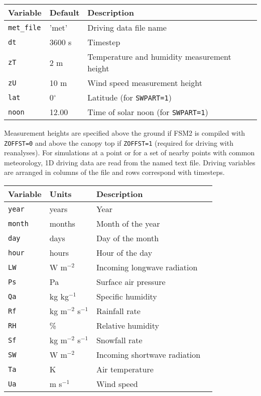 \documentclass{article}
\begin{document}
\begin{longtable}{|l|l|l|l|} \hline
Variable        & Default & Description                                 \\ \hline
{\tt met\_file} & 'met'   & Driving data file name                      \\
{\tt dt}        & 3600 s  & Timestep                                    \\
{\tt zT}        & 2 m     & Temperature and humidity measurement height \\
{\tt zU}        & 10 m    & Wind speed measurement height               \\
{\tt lat}       &0$^\circ$& Latitude (for {\tt SWPART=1})               \\
{\tt noon}      & 12.00   & Time of solar noon (for {\tt SWPART=1})     \\ \hline 
\end{longtable}

Measurement heights are specified above the ground if FSM2 is compiled with {\tt ZOFFST=0} and above the canopy top if {\tt ZOFFST=1} (required for driving with reanalyses). For simulations at a point or for a set of nearby points with common meteorology, 1D driving data are read from the named text file. Driving variables are arranged in columns of the file and rows correspond with timesteps.

\begin{longtable}{|l|l|l|l|} \hline
Variable    & Units    & Description                  \\ \hline
{\tt year}  & years    & Year                         \\
{\tt month} & months   & Month of the year            \\
{\tt day}   & days     & Day of the month             \\
{\tt hour}  & hours    & Hour of the day              \\
{\tt LW} & W m$^{-2}$  & Incoming longwave radiation  \\
{\tt Ps} & Pa          & Surface air pressure         \\
{\tt Qa} & kg kg$^{-1}$& Specific humidity            \\
{\tt Rf} & kg m$^{-2}$ s$^{-1}$ & Rainfall rate       \\
{\tt RH} & \%          & Relative humidity            \\
{\tt Sf} & kg m$^{-2}$ s$^{-1}$ & Snowfall rate       \\
{\tt SW} & W m$^{-2}$  & Incoming shortwave radiation \\
{\tt Ta} & K           & Air temperature              \\
{\tt Ua} & m s$^{-1}$  & Wind speed                   \\ \hline 
\end{longtable}
\end{document}

